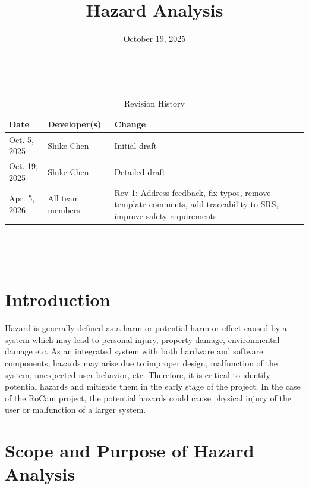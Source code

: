 \documentclass{article}
\title{Hazard Analysis\\\progname}
\author{\authname}
\date{October 19, 2025}
\begin{document}
\maketitle
\thispagestyle{empty}

~\newpage

\begin{table}[hp]
  \caption{Revision History} \label{TblRevisionHistory}
  \begin{tabularx}{\textwidth}{llX}
    \toprule
    \textbf{Date} & \textbf{Developer(s)} & \textbf{Change}                                                                                                    \\
    \midrule
    Oct. 5, 2025  & Shike Chen            & Initial draft                                                                                                      \\
    Oct. 19, 2025 & Shike Chen            & Detailed draft                                                                                                     \\
    Apr. 5, 2026  & All team members      & Rev 1: Address feedback, fix typos, remove template comments, add traceability to SRS, improve safety requirements \\
    \bottomrule
  \end{tabularx}
\end{table}

~\newpage

\tableofcontents

~\newpage

\section{Introduction}
Hazard is generally defined as a harm or potential harm or effect caused by a
system which may lead to personal injury, property damage, environmental damage
etc. As an integrated system with both hardware and software components,
hazards may arise due to improper design, malfunction of the system, unexpected
user behavior, etc. Therefore, it is critical to identify potential hazards and
mitigate them in the early stage of the project. In the case of the RoCam
project, the potential hazards could cause physical injury of the user or
malfunction of a larger system.

\section{Scope and Purpose of Hazard Analysis}
\end{document}
